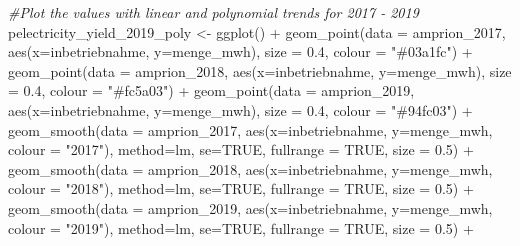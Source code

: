 \documentclass[a4paper,11pt]{article}
\newenvironment{Shaded}{\begin{snugshade}}{\end{snugshade}}
\newcommand{\AttributeTok}[1]{\textcolor[rgb]{0.77,0.63,0.00}{#1}}
\newcommand{\CommentTok}[1]{\textcolor[rgb]{0.56,0.35,0.01}{\textit{#1}}}
\newcommand{\ConstantTok}[1]{\textcolor[rgb]{0.00,0.00,0.00}{#1}}
\newcommand{\FloatTok}[1]{\textcolor[rgb]{0.00,0.00,0.81}{#1}}
\newcommand{\FunctionTok}[1]{\textcolor[rgb]{0.00,0.00,0.00}{#1}}
\newcommand{\NormalTok}[1]{#1}
\newcommand{\OtherTok}[1]{\textcolor[rgb]{0.56,0.35,0.01}{#1}}
\newcommand{\SpecialCharTok}[1]{\textcolor[rgb]{0.00,0.00,0.00}{#1}}
\newcommand{\StringTok}[1]{\textcolor[rgb]{0.31,0.60,0.02}{#1}}
\begin{document}
\begin{Shaded}
\begin{Highlighting}[]
\CommentTok{\#Plot the values with linear and polynomial trends for 2017 {-} 2019}
\NormalTok{pelectricity\_yield\_2019\_poly }\OtherTok{\textless{}{-}} \FunctionTok{ggplot}\NormalTok{() }\SpecialCharTok{+}
  \FunctionTok{geom\_point}\NormalTok{(}\AttributeTok{data =}\NormalTok{ amprion\_2017, }\FunctionTok{aes}\NormalTok{(}\AttributeTok{x=}\NormalTok{inbetriebnahme, }\AttributeTok{y=}\NormalTok{menge\_mwh), }
             \AttributeTok{size =} \FloatTok{0.4}\NormalTok{, }\AttributeTok{colour =} \StringTok{"\#03a1fc"}\NormalTok{) }\SpecialCharTok{+}
  \FunctionTok{geom\_point}\NormalTok{(}\AttributeTok{data =}\NormalTok{ amprion\_2018, }\FunctionTok{aes}\NormalTok{(}\AttributeTok{x=}\NormalTok{inbetriebnahme, }\AttributeTok{y=}\NormalTok{menge\_mwh), }
             \AttributeTok{size =} \FloatTok{0.4}\NormalTok{, }\AttributeTok{colour =} \StringTok{"\#fc5a03"}\NormalTok{) }\SpecialCharTok{+}
  \FunctionTok{geom\_point}\NormalTok{(}\AttributeTok{data =}\NormalTok{ amprion\_2019, }\FunctionTok{aes}\NormalTok{(}\AttributeTok{x=}\NormalTok{inbetriebnahme, }\AttributeTok{y=}\NormalTok{menge\_mwh), }
             \AttributeTok{size =} \FloatTok{0.4}\NormalTok{, }\AttributeTok{colour =} \StringTok{"\#94fc03"}\NormalTok{) }\SpecialCharTok{+}
  \FunctionTok{geom\_smooth}\NormalTok{(}\AttributeTok{data =}\NormalTok{ amprion\_2017, }
              \FunctionTok{aes}\NormalTok{(}\AttributeTok{x=}\NormalTok{inbetriebnahme, }\AttributeTok{y=}\NormalTok{menge\_mwh, }\AttributeTok{colour =} \StringTok{"2017"}\NormalTok{), }
              \AttributeTok{method=}\NormalTok{lm, }\AttributeTok{se=}\ConstantTok{TRUE}\NormalTok{, }\AttributeTok{fullrange =} \ConstantTok{TRUE}\NormalTok{, }\AttributeTok{size =} \FloatTok{0.5}\NormalTok{)  }\SpecialCharTok{+}
  \FunctionTok{geom\_smooth}\NormalTok{(}\AttributeTok{data =}\NormalTok{ amprion\_2018, }
              \FunctionTok{aes}\NormalTok{(}\AttributeTok{x=}\NormalTok{inbetriebnahme, }\AttributeTok{y=}\NormalTok{menge\_mwh, }\AttributeTok{colour =} \StringTok{"2018"}\NormalTok{), }
              \AttributeTok{method=}\NormalTok{lm, }\AttributeTok{se=}\ConstantTok{TRUE}\NormalTok{, }\AttributeTok{fullrange =} \ConstantTok{TRUE}\NormalTok{, }\AttributeTok{size =} \FloatTok{0.5}\NormalTok{)  }\SpecialCharTok{+}
  \FunctionTok{geom\_smooth}\NormalTok{(}\AttributeTok{data =}\NormalTok{ amprion\_2019, }
              \FunctionTok{aes}\NormalTok{(}\AttributeTok{x=}\NormalTok{inbetriebnahme, }\AttributeTok{y=}\NormalTok{menge\_mwh, }\AttributeTok{colour =} \StringTok{"2019"}\NormalTok{), }
              \AttributeTok{method=}\NormalTok{lm, }\AttributeTok{se=}\ConstantTok{TRUE}\NormalTok{, }\AttributeTok{fullrange =} \ConstantTok{TRUE}\NormalTok{, }\AttributeTok{size =} \FloatTok{0.5}\NormalTok{)  }\SpecialCharTok{+}

\end{Highlighting}
\end{Shaded}
\end{document}
